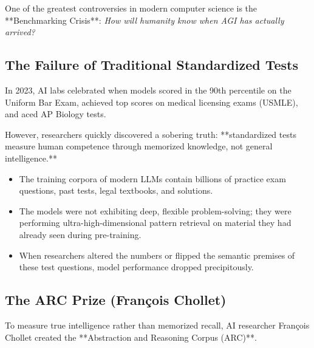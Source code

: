 \documentclass[11pt,journal,onecolumn]{IEEEtran}
\begin{document}
One of the greatest controversies in modern computer science is the **Benchmarking Crisis**: \textit{How will humanity know when AGI has actually arrived?}

\subsection{The Failure of Traditional Standardized Tests}
In 2023, AI labs celebrated when models scored in the 90th percentile on the Uniform Bar Exam, achieved top scores on medical licensing exams (USMLE), and aced AP Biology tests. 

However, researchers quickly discovered a sobering truth: **standardized tests measure human competence through memorized knowledge, not general intelligence.**
\begin{itemize}
    \item The training corpora of modern LLMs contain billions of practice exam questions, past tests, legal textbooks, and solutions.
    \item The models were not exhibiting deep, flexible problem-solving; they were performing ultra-high-dimensional pattern retrieval on material they had already seen during pre-training.
    \item When researchers altered the numbers or flipped the semantic premises of these test questions, model performance dropped precipitously.
\end{itemize}

\subsection{The ARC Prize (François Chollet)}
To measure true intelligence rather than memorized recall, AI researcher François Chollet created the **Abstraction and Reasoning Corpus (ARC)**.

\vspace{0.4em}
\noindent{}
\end{document}
